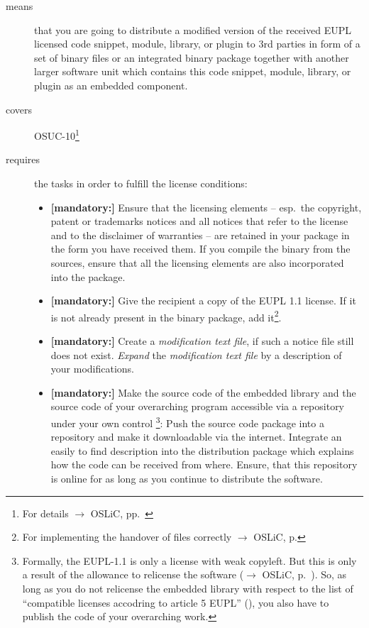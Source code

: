 \begin{description}
\item[means] that you are going to distribute a modified version of the received
EUPL licensed code snippet, module, library, or plugin to 3rd parties in form
of a set of binary files or an integrated binary package together with another
larger software unit which contains this code snippet, module, library, or
plugin as an embedded component.
\item[covers] OSUC-10\footnote{For details $\rightarrow$ OSLiC, pp.\ \pageref{OSUC-10-DEF}}
\item[requires] the tasks in order to fulfill the license conditions:
\begin{itemize}
  
  
  \item \textbf{[mandatory:]} Ensure that the licensing elements -- esp.\ the
  copyright, patent or trademarks notices and all notices that refer to the
  license and to the disclaimer of warranties -- are retained in your package in
  the form you have received them. If you compile the binary from the sources,
  ensure that all the licensing elements are also incorporated into the package.
  
  \item \textbf{[mandatory:]} Give the recipient a copy of the EUPL 1.1
  license. If it is not already present in the binary package, add
  it\footnote{For implementing the handover of files correctly $\rightarrow$
  OSLiC, p. \pageref{DistributingFilesHint}}.
 
  \item \textbf{[mandatory:]} Create a \emph{modification text file}, if such a
  notice file still does not exist. \emph{Expand} the \emph{modification text
  file} by a description of your modifications.
  
  \item \textbf{[mandatory:]} Make the source code of the embedded library and
  the source code of your overarching program accessible via a repository under
  your own control \footnote{Formally, the EUPL-1.1 is only a license with weak
  copyleft. But this is only a result of the allowance to relicense the software
  ($\rightarrow$ OSLiC, p.\ \pageref{sec:ProtectingPowerOfEupl}). So, as long as
  you do not relicense the embedded library with respect to the list of
  \enquote{compatible licenses accodring to article 5 EUPL} (\cite[cf.][\nopage
  wp §5 and Appendix]{EuplLicense2007en}), you also have to publish the code of
  your overarching work.}: Push the source code package into a repository and
  make it downloadable via the internet. Integrate an easily to find description
  into the distribution package which explains how the code can be received from
  where. Ensure, that this repository is online for as long as you continue to
  distribute the software.
  

\end{itemize}
\end{description}
